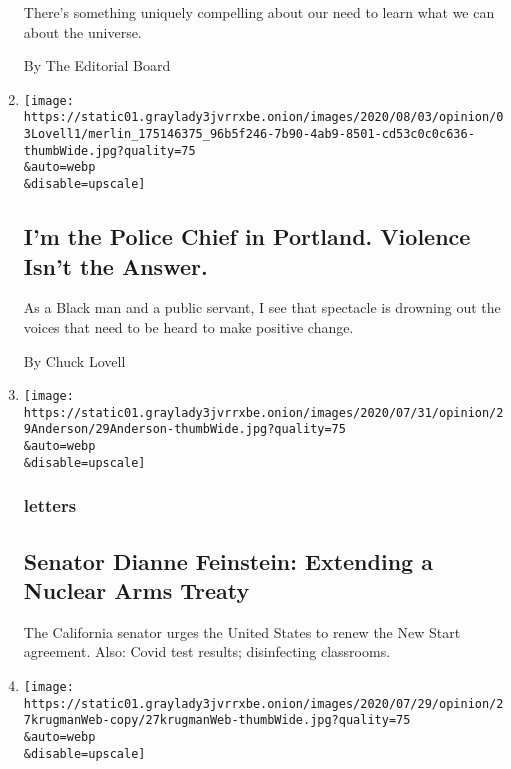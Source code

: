 \begin{enumerate}
  There's something uniquely compelling about our need to learn what we
  can about the universe.

  By The Editorial Board
\item
  \href{/2020/08/03/opinion/portland-protests-police-chief.html}{}

  \texttt{[image: https://static01.graylady3jvrrxbe.onion/images/2020/08/03/opinion/03Lovell1/merlin\_175146375\_96b5f246-7b90-4ab9-8501-cd53c0c0c636-thumbWide.jpg?quality=75\\\&auto=webp\\\&disable=upscale]}

  \hypertarget{im-the-police-chief-in-portland-violence-isnt-the-answer}{%
  \subsection{I'm the Police Chief in Portland. Violence Isn't the
  Answer.}\label{im-the-police-chief-in-portland-violence-isnt-the-answer}}

  As a Black man and a public servant, I see that spectacle is drowning
  out the voices that need to be heard to make positive change.

  By Chuck Lovell
\item
  \href{/2020/08/03/opinion/letters/nuclear-arms-treaty.html}{}

  \texttt{[image: https://static01.graylady3jvrrxbe.onion/images/2020/07/31/opinion/29Anderson/29Anderson-thumbWide.jpg?quality=75\\\&auto=webp\\\&disable=upscale]}

  \hypertarget{letters-2}{%
  \subsubsection{letters}\label{letters-2}}

  \hypertarget{senator-dianne-feinstein-extending-a-nuclear-arms-treaty}{%
  \subsection{Senator Dianne Feinstein: Extending a Nuclear Arms
  Treaty}\label{senator-dianne-feinstein-extending-a-nuclear-arms-treaty}}

  The California senator urges the United States to renew the New Start
  agreement. Also: Covid test results; disinfecting classrooms.
\item
  \href{/2020/08/03/opinion/letters/selfishness-society.html}{}

  \texttt{[image: https://static01.graylady3jvrrxbe.onion/images/2020/07/29/opinion/27krugmanWeb-copy/27krugmanWeb-thumbWide.jpg?quality=75\\\&auto=webp\\\&disable=upscale]}


\end{enumerate}
